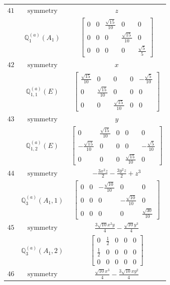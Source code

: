 \documentclass[fleqn,8pt,landscape]{jsarticle}
\begin{document}
\begin{longtable}{ccc}
$ 41 $ & $ \text{symmetry} $ & $ z $ \\
$  $ & $ \mathbb{Q}_{1}^{(a)}(A_{1}) $ & $ \begin{bmatrix} 0 & 0 & \frac{\sqrt{15}}{10} & 0 & 0 \\ 0 & 0 & 0 & \frac{\sqrt{15}}{10} & 0 \\ 0 & 0 & 0 & 0 & \frac{\sqrt{5}}{5} \end{bmatrix} $ \\ \hline
$ 42 $ & $ \text{symmetry} $ & $ x $ \\
$  $ & $ \mathbb{Q}_{1,1}^{(a)}(E) $ & $ \begin{bmatrix} \frac{\sqrt{15}}{10} & 0 & 0 & 0 & - \frac{\sqrt{5}}{10} \\ 0 & \frac{\sqrt{15}}{10} & 0 & 0 & 0 \\ 0 & 0 & \frac{\sqrt{15}}{10} & 0 & 0 \end{bmatrix} $ \\ \hline
$ 43 $ & $ \text{symmetry} $ & $ y $ \\
$  $ & $ \mathbb{Q}_{1,2}^{(a)}(E) $ & $ \begin{bmatrix} 0 & \frac{\sqrt{15}}{10} & 0 & 0 & 0 \\ - \frac{\sqrt{15}}{10} & 0 & 0 & 0 & - \frac{\sqrt{5}}{10} \\ 0 & 0 & 0 & \frac{\sqrt{15}}{10} & 0 \end{bmatrix} $ \\ \hline
$ 44 $ & $ \text{symmetry} $ & $ - \frac{3 x^{2} z}{2} - \frac{3 y^{2} z}{2} + z^{3} $ \\
$  $ & $ \mathbb{Q}_{3}^{(a)}(A_{1},1) $ & $ \begin{bmatrix} 0 & 0 & - \frac{\sqrt{10}}{10} & 0 & 0 \\ 0 & 0 & 0 & - \frac{\sqrt{10}}{10} & 0 \\ 0 & 0 & 0 & 0 & \frac{\sqrt{30}}{10} \end{bmatrix} $ \\ \hline
$ 45 $ & $ \text{symmetry} $ & $ \frac{3 \sqrt{10} x^{2} y}{4} - \frac{\sqrt{10} y^{3}}{4} $ \\
$  $ & $ \mathbb{Q}_{3}^{(a)}(A_{1},2) $ & $ \begin{bmatrix} 0 & \frac{1}{2} & 0 & 0 & 0 \\ \frac{1}{2} & 0 & 0 & 0 & 0 \\ 0 & 0 & 0 & 0 & 0 \end{bmatrix} $ \\ \hline
$ 46 $ & $ \text{symmetry} $ & $ \frac{\sqrt{10} x^{3}}{4} - \frac{3 \sqrt{10} x y^{2}}{4} $ \\

\end{longtable}
\end{document}
